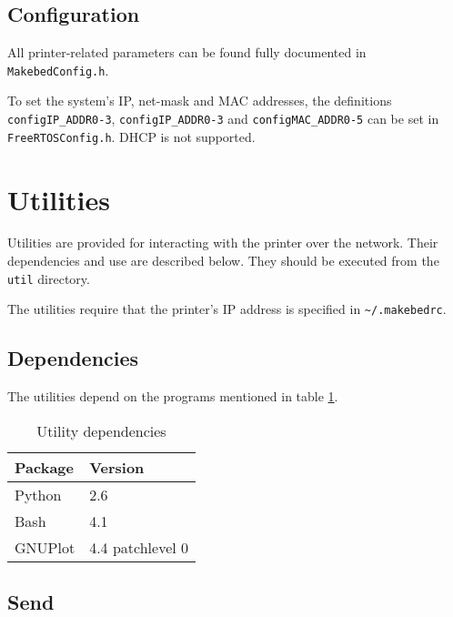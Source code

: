 		\subsection{Configuration}
			
			All printer-related parameters can be found fully documented in
			\verb|MakebedConfig.h|.
			
			To set the system's IP, net-mask and MAC addresses, the definitions
			\verb|configIP_ADDR0-3|, \verb|configIP_ADDR0-3| and
			\verb|configMAC_ADDR0-5| can be set in \verb|FreeRTOSConfig.h|. DHCP is
			not supported.
			
	
	\section{Utilities}
		
		\label{sec:utilDoc}
		
		Utilities are provided for interacting with the printer over the network.
		Their dependencies and use are described below. They should be executed from
		the \verb|util| directory.
		
		The utilities require that the printer's IP address is specified in
		\verb|~/.makebedrc|.
		
		\subsection{Dependencies}
			
			The utilities depend on the programs mentioned in table
			\ref{tab:utildependencies}.
			
			\begin{table}
				\centering
				\begin{tabular}{l l}
					\toprule
					Package & Version \\
					\midrule
					Python & 2.6 \\
					Bash & 4.1 \\
					GNUPlot & 4.4 patchlevel 0 \\
					\bottomrule
				\end{tabular}
				
				\caption{Utility dependencies}
				\label{tab:utildependencies}
			\end{table}
		
		\subsection{Send}
		
			\label{sec:makebedDoc}
			

